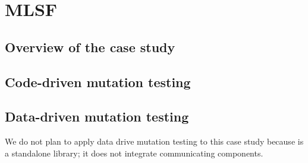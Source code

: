 \clearpage

\section{MLSF}
\label{sec:caseStudies:GSL:MLSF}

\subsection{Overview of the case study}



\subsection{Code-driven mutation testing}


\subsection{Data-driven mutation testing}

We do not plan to apply data drive mutation testing to this case study because is a standalone library; it does not integrate communicating components.



